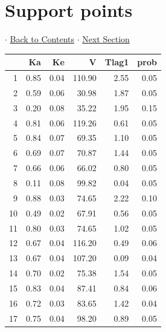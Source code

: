 \documentclass{article}
\begin{document}
          \section{Support points} 
 $\cdot$ \hyperlink{tableofcontents}{Back to Contents} $\cdot$ \hyperlink{ppe}{Next Section} \newline
          \newline 
\begin{tabular}{rrrrrr}
  \hline
 & Ka & Ke & V & Tlag1 & prob \\ 
  \hline
1 & 0.85 & 0.04 & 110.90 & 2.55 & 0.05 \\ 
  2 & 0.59 & 0.06 & 30.98 & 1.87 & 0.05 \\ 
  3 & 0.20 & 0.08 & 35.22 & 1.95 & 0.15 \\ 
  4 & 0.81 & 0.06 & 119.26 & 0.61 & 0.05 \\ 
  5 & 0.84 & 0.07 & 69.35 & 1.10 & 0.05 \\ 
  6 & 0.69 & 0.07 & 70.87 & 1.44 & 0.05 \\ 
  7 & 0.66 & 0.06 & 66.02 & 0.80 & 0.05 \\ 
  8 & 0.11 & 0.08 & 99.82 & 0.04 & 0.05 \\ 
  9 & 0.88 & 0.03 & 74.65 & 2.22 & 0.10 \\ 
  10 & 0.49 & 0.02 & 67.91 & 0.56 & 0.05 \\ 
  11 & 0.80 & 0.03 & 74.65 & 1.02 & 0.05 \\ 
  12 & 0.67 & 0.04 & 116.20 & 0.49 & 0.06 \\ 
  13 & 0.67 & 0.04 & 107.20 & 0.09 & 0.04 \\ 
  14 & 0.70 & 0.02 & 75.38 & 1.54 & 0.05 \\ 
  15 & 0.83 & 0.04 & 87.41 & 0.84 & 0.06 \\ 
  16 & 0.72 & 0.03 & 83.65 & 1.42 & 0.04 \\ 
  17 & 0.75 & 0.04 & 98.20 & 0.89 & 0.05 \\ 
   \hline
\end{tabular}
              
          \hypertarget{ppe}{}
          
\end{document}
